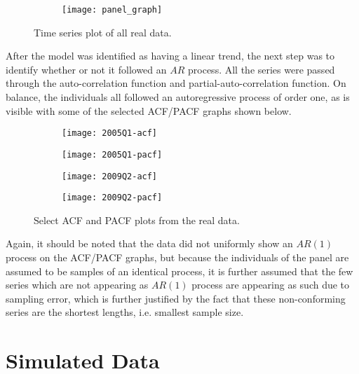 

\begin{figure}[htp]
	\centering
	\begin{subfigure}{0.75\textwidth}
		\centering
		\texttt{[image: panel\_graph]}
	\end{subfigure}
\caption{Time series plot of all real data.}
\end{figure}

After the model was identified as having a linear trend, the next step was to identify whether or not it followed an $AR$ process. All the series were passed through the auto-correlation function and partial-auto-correlation function. On balance, the individuals all followed an autoregressive process of order one, as is visible with some of the selected ACF/PACF graphs shown below. 


\begin{figure}[htp]
	\centering
	\begin{subfigure}{0.23\textwidth}
		\centering
		\texttt{[image: 2005Q1-acf]}
	\end{subfigure}
	\begin{subfigure}{0.23\textwidth}
		\centering
		\texttt{[image: 2005Q1-pacf]}
	\end{subfigure}
	\begin{subfigure}{0.23\textwidth}
		\centering
		\texttt{[image: 2009Q2-acf]}
	\end{subfigure}
	\begin{subfigure}{0.23\textwidth}
		\centering
		\texttt{[image: 2009Q2-pacf]}
	\end{subfigure}
\caption{Select ACF and PACF plots from the real data.}
\end{figure}

Again, it should be noted that the data did not uniformly show an $AR(1)$ process on the ACF/PACF graphs, but because the individuals of the panel are assumed to be samples of an identical process, it is further assumed that the few series which are not appearing as $AR(1)$ process are appearing as such due to sampling error, which is further justified by the fact that these non-conforming series are the shortest lengths, i.e. smallest sample size.


\section{Simulated Data}

